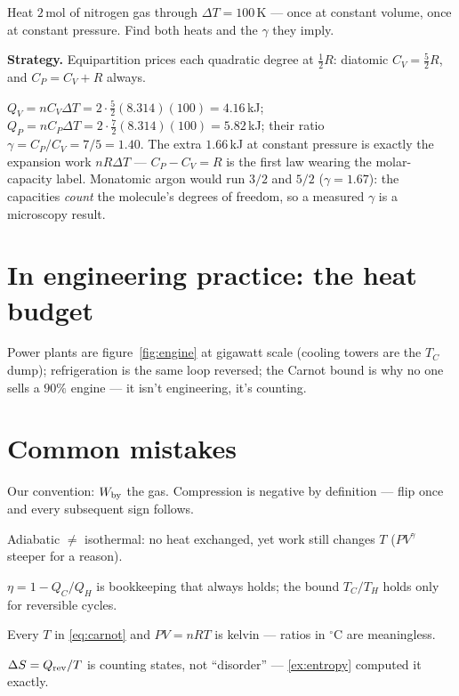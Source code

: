 \begin{example}\label{ex:molar}
Heat $2$\,mol of nitrogen gas through $\Delta T=100$\,K --- once at
constant volume, once at constant pressure. Find both heats and the
$\gamma$ they imply.
\par\smallskip
\textbf{Strategy.} Equipartition prices each quadratic degree at
$\tfrac12R$: diatomic $C_V=\tfrac52R$, and $C_P=C_V+R$ always.
\begin{solution}
$Q_V=nC_V\Delta T=2\cdot\tfrac52(8.314)(100)=4.16$\,kJ;
$Q_P=nC_P\Delta T=2\cdot\tfrac72(8.314)(100)=5.82$\,kJ;
their ratio $\gamma=C_P/C_V=7/5=1.40$.
The extra $1.66$\,kJ at constant pressure is exactly the expansion
work $nR\Delta T$ --- $C_P-C_V=R$ is the first law wearing the
molar-capacity label. Monatomic argon would run $3/2$ and $5/2$
($\gamma=1.67$): the capacities \emph{count} the molecule's degrees
of freedom, so a measured $\gamma$ is a microscopy result.
\checkmark
\end{solution}
\end{example}

\section{In engineering practice: the heat budget}\label{sec:th-eng}

Power plants are figure~\ref{fig:engine} at gigawatt scale (cooling
towers are the $T_C$ dump); refrigeration is the same loop reversed;
the Carnot bound is why no one sells a $90\%$ engine --- it isn't
engineering, it's counting.

\section{Common mistakes}\label{sec:th-mistakes}

\begin{tripwire}
Our convention: $W_{\rm by}$ the gas. Compression is negative by
definition --- flip once and every subsequent sign follows.
\end{tripwire}
\begin{tripwire}[$Q=0$ read as $\Delta T=0$]
Adiabatic $\ne$ isothermal: no heat exchanged, yet work still changes
$T$ ($PV^\gamma$ steeper for a reason).
\end{tripwire}
\begin{tripwire}
$\eta=1-Q_C/Q_H$ is bookkeeping that always holds; the bound
$T_C/T_H$ holds only for reversible cycles.
\end{tripwire}
\begin{tripwire}
Every $T$ in \eqref{eq:carnot} and $PV=nRT$ is kelvin --- ratios in
${}^{\circ}$C are meaningless.
\end{tripwire}
\begin{tripwire}
$\Delta S=Q_{\rm rev}/T$ is counting states, not ``disorder'' ---
\ref{ex:entropy} computed it exactly.
\end{tripwire}

